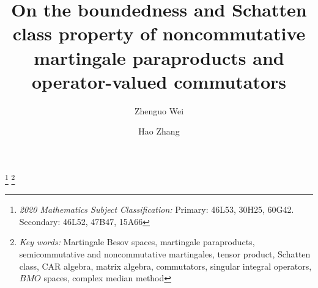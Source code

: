 \documentclass[oneside,english,a4wide]{amsart}
\numberwithin{equation}{section}
\numberwithin{figure}{section}
\theoremstyle{plain}
\theoremstyle{plain}
\theoremstyle{definition}
\theoremstyle{plain}
\theoremstyle{remark}
\theoremstyle{definition}
\theoremstyle{remark}
\theoremstyle{definition}
\newcommand{\8}{\infty}
\begin{document}
	
	
	
	
	\title[noncommutative martingale paraproducts and operator-valued commutators]{On the boundedness and Schatten class property of noncommutative martingale paraproducts and operator-valued commutators}
	
	\thanks{{\it 2020 Mathematics Subject Classification:} Primary: 46L53, 30H25, 60G42. Secondary: 46L52, 47B47, 15A66}
	\thanks{{\it Key words:} Martingale Besov spaces, martingale paraproducts, semicommutative and noncommutative martingales, tensor product, Schatten class, CAR algebra, matrix algebra, commutators, singular integral operators, $BMO$ spaces, complex median method}
	
	\author[Zhenguo Wei]{Zhenguo Wei}
	\address{Laboratoire de Math{\'e}matiques, Universit{\'e} de Bourgogne Franche-Comt{\'e}, 25030 Besan\c{c}on Cedex, France}
	
	
	\author[Hao Zhang]{Hao Zhang}
	\address{%
	Department of Mathematics, University of Illinois Urbana-Champaign, USA}
	\date{}
	\maketitle
	
\end{document}
